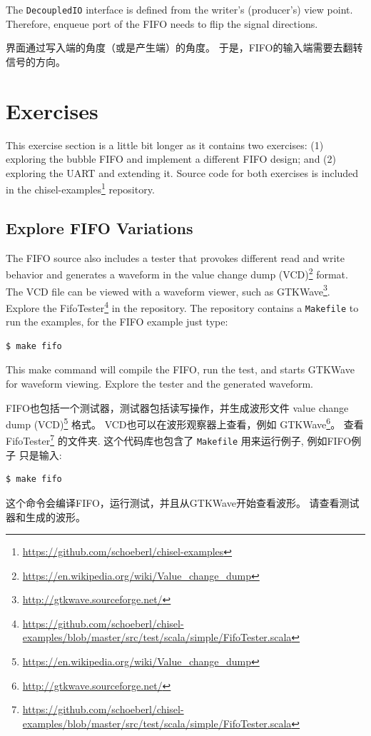\documentclass[%
    10pt,
    headinclude, footexclude,
    openright, %
    notitlepage,
    cleardoubleempty,
    headsepline,
    pointlessnumbers,
    bibtotoc, idxtotoc,
    ]{scrbook}
\newcommand{\code}[1]{{\small{\texttt{#1}}}}
\newcommand{\myref}[2]{\href{#1}{#2}}
\renewcommand{\myref}[2]{{#2}{\footnote{\url{#1}}}}
\begin{document}
{

\noindent The \code{DecoupledIO} interface is defined from the writer's (producer's) view point.
Therefore, enqueue port of the FIFO needs to flip the signal directions.

\noindent \code{DecoupledIO}界面通过写入端的角度（或是产生端）的角度。
于是，FIFO的输入端需要去翻转信号的方向。

\section{Exercises}

This exercise section is a little bit longer as it contains two exercises:
(1) exploring the bubble FIFO and implement a different FIFO design;
and (2) exploring the UART and extending it.
Source code for both exercises is included in the
\myref{https://github.com/schoeberl/chisel-examples}{chisel-examples} repository.

\subsection{Explore FIFO Variations}

The FIFO source also includes a tester that provokes different read and write behavior and generates a waveform in the 
\myref{https://en.wikipedia.org/wiki/Value_change_dump}{value change dump (VCD)} format.
The VCD file can be viewed with a waveform viewer, such as
\myref{http://gtkwave.sourceforge.net/}{GTKWave}.
Explore the
\myref{https://github.com/schoeberl/chisel-examples/blob/master/src/test/scala/simple/FifoTester.scala}{FifoTester} in the repository.
The repository contains a \code{Makefile} to run the examples, for the FIFO example
just type:
\begin{verbatim}
$ make fifo
\end{verbatim}
This make command will compile the FIFO, run the test, and starts GTKWave for waveform
viewing. Explore the tester and the generated waveform.

FIFO也包括一个测试器，测试器包括读写操作，并生成波形文件
\myref{https://en.wikipedia.org/wiki/Value_change_dump}{value change dump (VCD)} 格式。
VCD也可以在波形观察器上查看，例如
\myref{http://gtkwave.sourceforge.net/}{GTKWave}。
查看
\myref{https://github.com/schoeberl/chisel-examples/blob/master/src/test/scala/simple/FifoTester.scala}{FifoTester} 的文件夹.
这个代码库也包含了 \code{Makefile} 用来运行例子, 例如FIFO例子
只是输入:
\begin{verbatim}
$ make fifo
\end{verbatim}
这个命令会编译FIFO，运行测试，并且从GTKWave开始查看波形。
请查看测试器和生成的波形。

}
\end{document}
